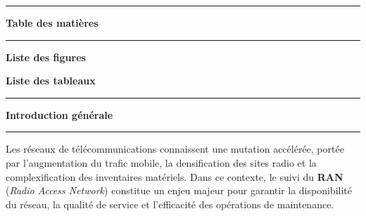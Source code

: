 \documentclass[12pt,a4paper]{report}
\begin{document}
\thispagestyle{plain}
\vspace*{0.8cm}
\noindent\hspace*{1.25cm}\begin{minipage}[c]{0.06\textwidth}\color{black}\rule{0.42cm}{1.25cm}\end{minipage}\hspace{-0.15cm}%
\begin{minipage}[c]{0.75\textwidth}{\LARGE\bfseries Table des matières}\\[-0.15cm]\rule{0.78\textwidth}{0.5pt}\end{minipage}
\vspace{0.8cm}
\tableofcontents
\clearpage

\thispagestyle{plain}
\vspace*{0.8cm}
{\LARGE\bfseries Liste des figures}\vspace{0.8cm}
\listoffigures
\clearpage

\thispagestyle{plain}
\vspace*{0.8cm}
{\LARGE\bfseries Liste des tableaux}\vspace{0.8cm}
\listoftables
\clearpage

\setcounter{page}{1}

\clearpage\pagestyle{fancy}\thispagestyle{fancy}
\vspace*{1.2cm}
\noindent\hspace*{1.25cm}\begin{minipage}[c]{0.06\textwidth}\color{black}\rule{0.42cm}{1.25cm}\end{minipage}\hspace{-0.15cm}%
\begin{minipage}[c]{0.75\textwidth}{\LARGE\bfseries Introduction générale}\\[-0.15cm]\rule{0.78\textwidth}{0.5pt}\end{minipage}
\vspace{1.35cm}

Les réseaux de télécommunications connaissent une mutation accélérée, portée par l'augmentation du trafic mobile, la densification des sites radio et la complexification des inventaires matériels. Dans ce contexte, le suivi du \textbf{RAN} (\textit{Radio Access Network}) constitue un enjeu majeur pour garantir la disponibilité du réseau, la qualité de service et l'efficacité des opérations de maintenance.
\end{document}
